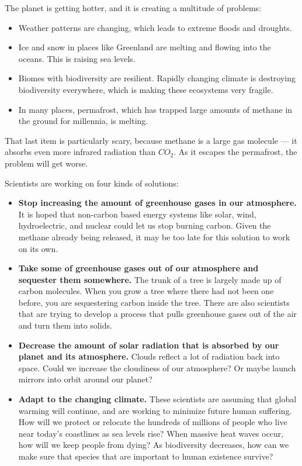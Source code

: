The planet is getting hotter, and it is creating a multitude of
problems:
\begin{itemize}
\item Weather patterns are changing, which leads to extreme floods and
  droughts.
  
\item Ice and snow in places like Greenland are melting and flowing
  into the oceans. This is raising sea levels.
  
\item Biomes with biodiversity are resilient. Rapidly changing climate
  is destroying biodiversity everywhere, which is making these ecosystems
  very fragile.
  
\item In many places, permafrost, which has trapped large amounts of
  methane in the ground for millennia, is melting.
\end{itemize}

That last item is particularly scary, because methane is a large gas
molecule --- it absorbs even more infrared radiation than $CO_2$. As it
escapes the permafrost, the problem will get worse.

Scientists are working on four kinds of solutions:
\begin{itemize}
  \item \textbf{Stop increasing the amount of greenhouse gases in our
    atmosphere.} It is hoped that non-carbon based energy systems like
    solar, wind, hydroelectric, and nuclear could let us stop burning
    carbon. Given the methane already being released, it may be too
    late for this solution to work on its own.

  \item \textbf{Take some of greenhouse gases out of our atmosphere and
    sequester them somewhere.} The trunk of a tree is largely made up of carbon
    molecules. When you grow a tree where there had not been one
    before, you are sequestering carbon inside the tree.  There are
    also scientists that are trying to develop a process that pulls
    greenhouse gases out of the air and turn them into solids.

  \item \textbf{Decrease the amount of solar radiation that is
    absorbed by our planet and its atmosphere.} Clouds reflect a lot of radiation back into
    space. Could we increase the cloudiness of our atmosphere? Or
    maybe launch mirrors into orbit around our planet?

  \item \textbf{Adapt to the changing climate.} These scientists are
    assuming that global warming will continue, and are working to
    minimize future human suffering. How will we protect or relocate the hundreds of millions of people who
    live near today's coastlines as sea levels rise?  When massive heat waves
    occur, how will we keep people from dying?  As biodiversity
    decreases, how can we make sure that species that are important to
    human existence survive?
    
\end{itemize}

